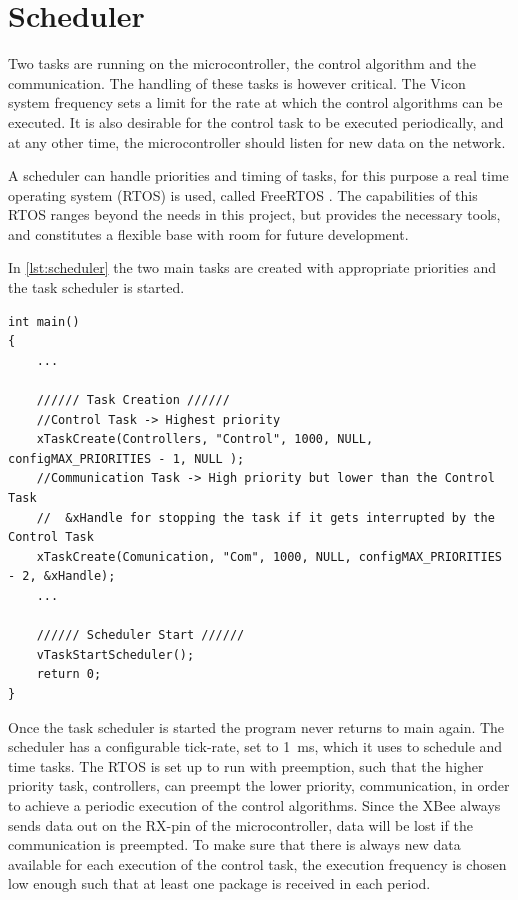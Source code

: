 \section{Scheduler}\label{sec:Scheduler}
Two tasks are running on the microcontroller, the control algorithm and the communication. The handling of these tasks is however critical. The Vicon system frequency sets a limit for the rate at which the control algorithms can be executed. It is also desirable for the control task to be executed periodically, and at any other time, the microcontroller should listen for new data on the network.

A scheduler can handle priorities and timing of tasks, for this purpose a real time operating system (RTOS) is used, called FreeRTOS \cite{freeRtos}. The capabilities of this RTOS ranges beyond the needs in this project, but provides the necessary tools, and constitutes a flexible base with room for future development.

In \autoref{lst:scheduler} the two main tasks are created with appropriate priorities and the task scheduler is started.

\begin{lstlisting}[style=customcpp,
                    caption={Code for initialization, creation of the different tasks, start sequence for the motors and call to the scheduler.}, 
                    label=lst:scheduler]
int main()
{
    ... 
    
    ////// Task Creation //////
    //Control Task -> Highest priority
    xTaskCreate(Controllers, "Control", 1000, NULL, configMAX_PRIORITIES - 1, NULL );
    //Communication Task -> High priority but lower than the Control Task
	//	&xHandle for stopping the task if it gets interrupted by the Control Task
    xTaskCreate(Comunication, "Com", 1000, NULL, configMAX_PRIORITIES - 2, &xHandle);
    ...

    ////// Scheduler Start //////
    vTaskStartScheduler();
    return 0;
}
\end{lstlisting}

Once the task scheduler is started the program never returns to main again. The scheduler has a configurable tick-rate, set to \SI{1}{ms}, which it uses to schedule and time tasks. The RTOS is set up to run with preemption, such that the higher priority task, controllers, can preempt the lower priority, communication, in order to achieve a periodic execution of the control algorithms. Since the XBee always sends data out on the RX-pin of the microcontroller, data will be lost if the communication is preempted. To make sure that there is always new data available for each execution of the control task, the execution frequency is chosen low enough such that at least one package is received in each period.

